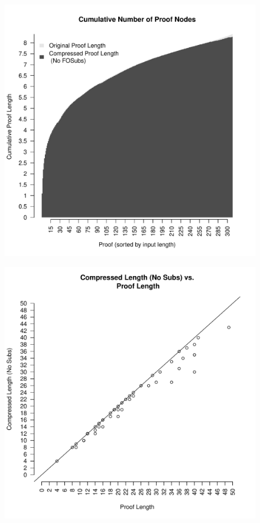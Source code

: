 \begin{figure}
\includegraphics[scale=0.5]{images/cumulative_res_nodes_no_subs_log.pdf}
\end{figure}
\begin{figure}
\includegraphics[scale=0.5]{images/compress_length_no_sub_vs_length.pdf}
\end{figure}
